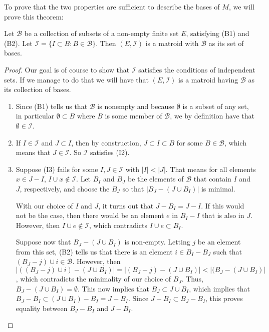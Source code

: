 To prove that the two properties are sufficient to describe the bases of $M$, we will prove this theorem:
\begin{theorem}
    Let $\mathcal{B}$ be a collection of subsets of a non-empty finite set $E$, satisfying (B1) and (B2). Let $\mathcal{I}=\{ I\subset B : B\in\mathcal{B} \}$. Then $(E,\mathcal{I})$ is a matroid with $\mathcal{B}$ as its set of bases.
\end{theorem}
\begin{proof}
    Our goal is of course to show that $\mathcal{I}$ satisfies the conditions of independent sets. If we manage to do that we will have that $(E, \mathcal{I})$ is a matroid having $\mathcal{B}$ as its collection of bases.
    \begin{enumerate}
        \item Since (B1) tells us that $\mathcal{B}$ is nonempty and because $\emptyset$ is a subset of any set, in particular $\emptyset \subset B$ where $B$ is some member of $\mathcal{B}$, we by definition have that $\emptyset \in \mathcal{I}$.
        
        \item If $I\in\mathcal{I}$ and $J\subset I$, then by construction, $J\subset I\subset B$ for some $B\in\mathcal{B}$, which means that $J\in\mathcal{I}$. So $\mathcal{I}$ satisfies (I2).
        
        \item Suppose (I3) fails for some $I,J\in\mathcal{I}$ with $|I|<|J|$. That means for all elements $x\in J-I$, $I\cup x \notin \mathcal{I}$. Let $B_I$ and $B_J$ be the elements of $\mathcal{B}$ that contain $I$ and $J$, respectively, and choose the $B_J$ so that $|B_J - (J\cup B_I)|$ is minimal. 
    
        With our choice of $I$ and $J$, it turns out that $J-B_I = J-I$. If this would not be the case, then there would be an element $e$ in $B_I-I$ that is also in $J$. However, then $I\cup e\notin \mathcal{I}$, which contradicts $I\cup e\subset B_I$.

        Suppose now that $B_J-(J\cup B_I)$ is non-empty. Letting $j$ be an element from this set, (B2) tells us that there is an element $i\in B_I-B_J$ such that $(B_J-j)\cup i \in\mathcal{B}$. However, then $|((B_J-j)\cup i)-(J\cup B_I)|=|(B_J-j)-(J\cup B_I)|<|(B_J-(J\cup B_I)|$, which contradicts the minimality of our choice of $B_J$. Thus, $B_J-(J\cup B_I)=\emptyset$. This now implies that $B_J\subset J\cup B_I$, which implies that $B_J-B_I\subset (J\cup B_I)-B_I=J-B_I$. Since $J-B_I\subset B_J-B_I$, this proves equality between $B_J-B_I$ and $J-B_I$.


\end{enumerate}
\end{proof}
